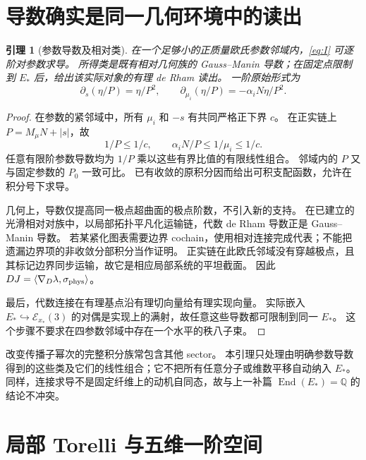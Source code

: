 \documentclass[11pt,a4paper]{ctexart}
\theoremstyle{cnplain}
\newtheorem{lemma}[theorem]{引理}
\theoremstyle{definition}
\theoremstyle{remark}
\newcommand{\Q}{\mathbb Q}
\newcommand{\cE}{\mathcal E}
\begin{document}
\section{导数确实是同一几何环境中的读出}
\begin{lemma}[参数导数及相对类]\label{lem:actual}
在一个足够小的正质量欧氏参数邻域内，\eqref{eq:I} 可逐阶对参数求导。
所得类是既有相对几何族的 Gauss--Manin 导数；在固定点限制到 $E_*$ 后，给出该实际对象的有理 de Rham 读出。
一阶原始形式为
\begin{equation}\label{eq:derforms}
 \partial_s(\eta/P)=\eta/P^2,\qquad
 \partial_{\mu_i}(\eta/P)=-\alpha_iN\eta/P^2.
\end{equation}
\end{lemma}
\begin{proof}
在参数的紧邻域中，所有 $\mu_i$ 和 $-s$ 有共同严格正下界 $c$。
在正实链上 $P=M_\mu N+|s|$，故
\[
 1/P\le 1/c,\qquad \alpha_iN/P\le1/\mu_i\le1/c.
\]
任意有限阶参数导数均为 $1/P$ 乘以这些有界比值的有限线性组合。
邻域内的 $P$ 又与固定参数的 $P_0$ 一致可比。
已有收敛的原积分因而给出可积支配函数，允许在积分号下求导。

几何上，导数仅提高同一极点超曲面的极点阶数，不引入新的支持。
在已建立的光滑相对对族中，以局部拓扑平凡化运输链，代数 de Rham 导数正是 Gauss--Manin 导数。
若某紧化图表需要边界 cochain，使用相对连接完成代表；不能把遗漏边界项的非收敛分部积分当作证明。
正实链在此欧氏邻域没有穿越极点，且其标记边界同步运输，故它是相应局部系统的平坦截面。
因此 $D J=\langle\nabla_D\lambda,\sigma_{\rm phys}\rangle$。

最后，代数连接在有理基点沿有理切向量给有理实现向量。
实际嵌入 $E_*\hookrightarrow\cE_{x_*}(3)$ 的对偶是实现上的满射，故任意这些导数都可限制到同一 $E_*$。
这个步骤不要求在四参数邻域中存在一个水平的秩八子束。
\end{proof}

改变传播子幂次的完整积分族常包含其他 sector。
本引理只处理由明确参数导数得到的这些类及它们的线性组合；它不把所有任意分子或维数平移自动纳入 $E_*$。
同样，连接求导不是固定纤维上的动机自同态，故与上一补篇 $\operatorname{End}(E_*)=\Q$ 的结论不冲突。

\section{局部 Torelli 与五维一阶空间}
\end{document}
